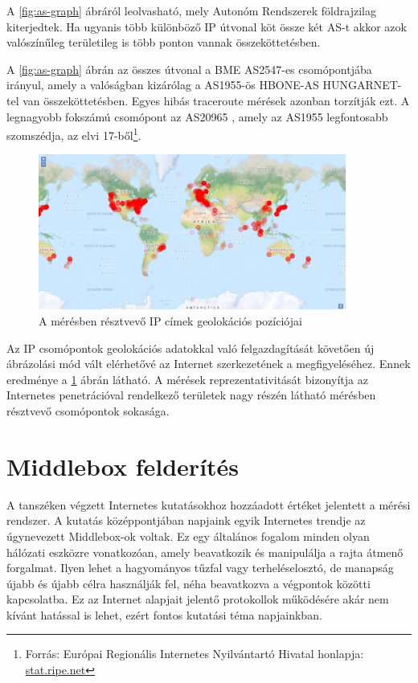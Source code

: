 A \ref{fig:as-graph} ábráról leolvasható, mely Autonóm Rendszerek földrajzilag kiterjedtek. Ha ugyanis több különböző IP útvonal köt össze két AS-t akkor azok valószínűleg területileg is több ponton vannak összeköttetésben.

A \ref{fig:as-graph} ábrán az összes útvonal a BME AS2547-es csomópontjába irányul, amely a valóságban kizárólag a AS1955-ös HBONE-AS HUNGARNET-tel van összeköttetésben. Egyes hibás traceroute mérések azonban torzítják ezt. A legnagyobb fokszámú csomópont az AS20965 , amely az AS1955 legfontosabb szomszédja, az elvi 17-ből\footnote{Forrás: Európai Regionális Internetes Nyilvántartó Hivatal honlapja: \href{https://stat.ripe.net/widget/asn-neighbours\#w.resource=1955}{stat.ripe.net}}.



\begin{figure}[h!]
	\centering
	\includegraphics[width=0.9\textwidth, keepaspectratio]{figures/ip_map.png}
	\caption{A mérésben résztvevő IP címek geolokációs pozíciójai}
	\label{fig:ip-map}
\end{figure}

Az IP csomópontok geolokációs adatokkal való felgazdagítását követően új ábrázolási mód vált elérhetővé az Internet szerkezetének a megfigyeléséhez. Ennek eredménye a \ref{fig:ip-map} ábrán látható. A mérések reprezentativitását bizonyítja az Internetes penetrációval rendelkező területek nagy részén látható mérésben résztvevő csomópontok sokasága.

\pagebreak

\section{Middlebox felderítés}
A tanszéken végzett Internetes kutatásokhoz hozzáadott értéket jelentett a mérési rendszer. A kutatás középpontjában napjaink egyik Internetes trendje az úgynevezett Middlebox-ok voltak. Ez egy általános fogalom minden olyan hálózati eszközre vonatkozóan, amely beavatkozik és manipulálja a rajta átmenő forgalmat. Ilyen lehet a hagyományos tűzfal vagy terheléselosztó, de manapság újabb és újabb célra használják fel, néha beavatkozva a végpontok közötti kapcsolatba. Ez az Internet alapjait jelentő protokollok működésére akár nem kívánt hatással is lehet, ezért fontos kutatási téma napjainkban.

